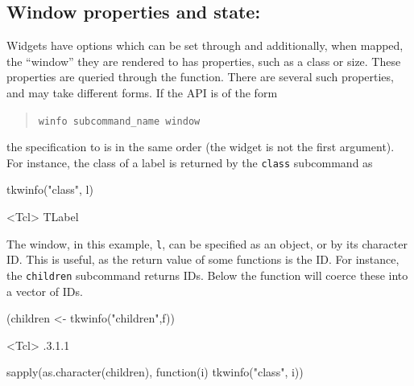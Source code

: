 \subsection{Window properties and state: }
\label{sec:tcltk:overview:widget-properties}

Widgets have options which can be set through  and
additionally, when mapped, the ``window'' they are rendered to has
properties, such as a class or size. These properties are queried
through the  function.  There are several such
properties, and may take different forms. If the API is of the form

\begin{quotation}
\texttt{winfo subcommand\_name window}  
\end{quotation}
the specification to  is in the same order (the widget is not the first argument). For instance, the class of a label is returned by the \texttt{class} subcommand as

\begin{Schunk}
\begin{Sinput}
 tkwinfo("class", l)
\end{Sinput}
\begin{Soutput}
<Tcl> TLabel 
\end{Soutput}
\end{Schunk}

The window, in this example, \texttt{l}, can be specified as an \R\/
object, or by its character ID. This is useful, as the return value of
some functions is the ID. For instance, the \texttt{children}
subcommand returns IDs. Below the  function will
coerce these into a vector of IDs.

\begin{Schunk}
\begin{Sinput}
 (children <- tkwinfo("children",f))
\end{Sinput}
\begin{Soutput}
<Tcl> .3.1.1 
\end{Soutput}
\begin{Sinput}
 sapply(as.character(children), function(i) tkwinfo("class", i))
\end{Sinput}
\end{Schunk}

